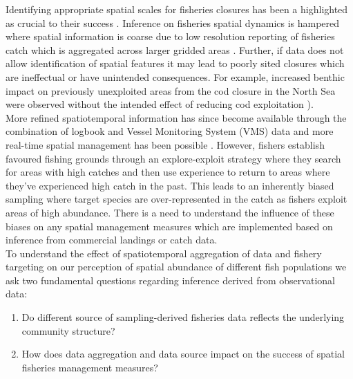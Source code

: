 \documentclass[review]{elsarticle}
\begin{document}
Identifying appropriate spatial scales for fisheries closures has been a
highlighted as crucial to their success \citep{Costello2010, Dunn2016}.
Inference on fisheries spatial dynamics is hampered where spatial information
is coarse due to low resolution reporting of fisheries catch which is
aggregated across larger gridded areas \citep{Branch2005}. Further, if data
does not allow identification of spatial features it may lead to poorly sited
closures which are ineffectual or have unintended consequences. For example,
increased benthic impact on previously unexploited areas from the cod closure
in the North Sea were observed without the intended effect of reducing cod
exploitation \citep{Rijnsdorp2001,Dinmore2003}).\\ 

More refined spatiotemporal information has since become available through the
combination of logbook and Vessel Monitoring System (VMS) data \citep{Lee2010,
	Bastardie2010, Gerritsen2012, Mateo2016} and more real-time spatial
management has been possible \citep[e.g.][]{Holmes2011}.  However, fishers
establish favoured fishing grounds through an explore-exploit strategy
\citep{Rijnsdorp2011, Bailey2018} where they search for areas with high catches
and then use experience to return to areas where they've experienced high catch
in the past. This leads to an inherently biased sampling where target species
are over-represented in the catch as fishers exploit areas of high abundance.
There is a need to understand the influence of these biases on any spatial
management measures which are implemented based on inference from commercial
landings or catch data. \\ 

To understand the effect of spatiotemporal aggregation of data and fishery
targeting on our perception of spatial abundance of different fish populations
we ask two fundamental questions regarding inference derived from observational
data:

\begin{enumerate}
	\item Do different source of sampling-derived fisheries data
		reflects the underlying community structure? 	
	\item How does data aggregation and data source impact on the success
		of spatial fisheries management measures?
\end{enumerate}
	
\end{document}
